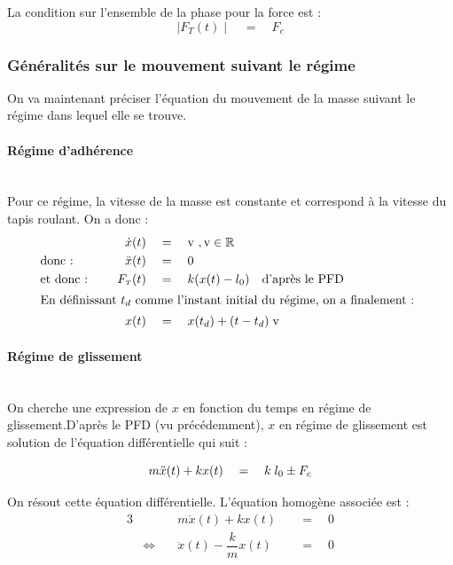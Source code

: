\documentclass{article}
\newcommand{\ts}{\scriptscriptstyle}
\begin{document}
La condition sur l'ensemble de la phase pour la force est :
$$\mid F_{\ts{T}}(t)\mid\quad=\quad F_c$$
%
\subsubsection{Généralités sur le mouvement suivant le régime}\label{ssseq_1.1.2}
On va maintenant préciser l'équation du mouvement de la masse suivant le régime dans lequel elle se trouve. 

\paragraph{Régime d'adhérence}\label{par_1.1.2.1}
\mbox{}\\
Pour ce régime, la vitesse de la masse est constante et correspond à la vitesse du tapis roulant. On a donc :
\begin{alignat}{2}
& &\dot{x}(t)\quad & =\quad \text{v}~,\text{v}\in\mathbb{R} \nonumber\\
&\text{donc :} \quad & \ddot{x}(t)\quad & = \quad 0 \nonumber\\
&\text{et donc :} \quad & F_{\ts{T}}(t)\quad &= \quad k(x(t)-l_0) \quad \text{d'après le PFD} \nonumber\\
\intertext{En définissant $t_d$ comme l'instant initial du régime, on a finalement : }
& & \quad x(t) \quad &= \quad x(t_d)+(t-t_d)\;\text{v} \label{eq_3}
\end{alignat}
\paragraph{Régime de glissement}\label{par_1.1.2.2}
\mbox{}\\
On cherche une expression de $x$ en fonction du temps en régime de glissement.D'après le PFD (vu précédemment), $x$ en régime de glissement est solution de l'équation différentielle qui suit :

\begin{equation}
m\ddot{x}(t)+kx(t)\quad=\quad k\;l_0 \pm F_c \label{eq_4}\\
\end{equation}

On résout cette équation différentielle. L'équation homogène associée est : 
\begin{alignat}{3}
& \quad & m\ddot{x}(t)+kx(t) \quad & = \quad 0 \label{eq_5}\\
& \Longleftrightarrow \quad & \ddot{x}(t)-\dfrac{k}{m}x(t)\quad & = \quad 0 \nonumber
\end{alignat}
\end{document}
